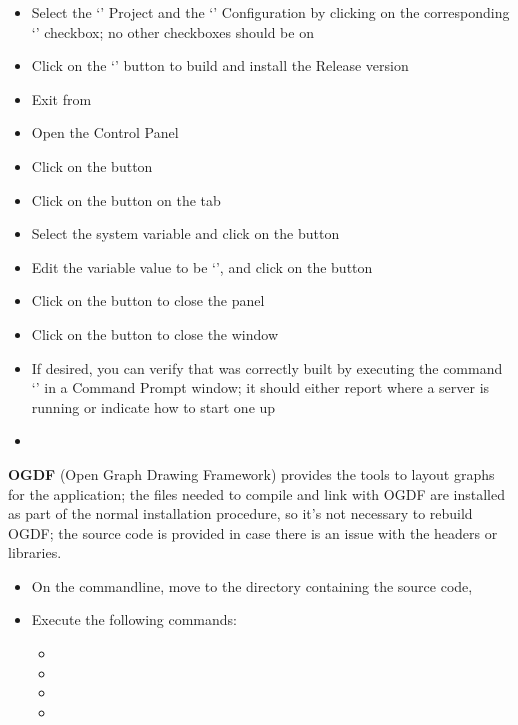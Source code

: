 \begin{itemize}
`'
\item\exSp{}Select the `' Project and the `'
Configuration by clicking on the corresponding `' checkbox; no other
checkboxes should be on
\item\exSp{}Click on the `' button to build and install the Release version
\item\exSp{}Exit from 
\item\exSp{}Open the  Control Panel
\item\exSp{}Click on the  button
\item\exSp{}Click on the  button on the 
tab
\item\exSp{}Select the  system variable and click on the
 button 
\item\exSp{}Edit the variable value to be
`', and click on the 
button
\item\exSp{}Click on the  button to close the 
panel
\item\exSp{}Click on the  button to close the 
window
\item\exSp{}If desired, you can verify that \yarp{} was correctly built by executing the
command `' in a Command Prompt window; it should either report where a
\yarp{} server is running or indicate how to start one up
\end{itemize}
\tertiaryEnd
{}
\begin{itemize}
\item\TBD
\end{itemize}
\tertiaryEnd
\secondaryEnd
{}
\textbf{OGDF} (Open Graph Drawing Framework) provides the tools to layout graphs for the
\MMMU{} application; the files needed to compile and link with OGDF are installed as part
of the normal \mplusm{} installation procedure, so it's not necessary to rebuild OGDF; the
source code is provided in case there is an issue with the headers or libraries.
\begin{itemize}
\item On the command\longDash{}line, move to the directory containing the \mplusm{} source
code, 
\item\exSp{}Execute the following commands:
\begin{itemize}
\item{}
\item\exSp{}
\item\exSp{}
\item\exSp{}
\end{itemize}
\end{itemize}
